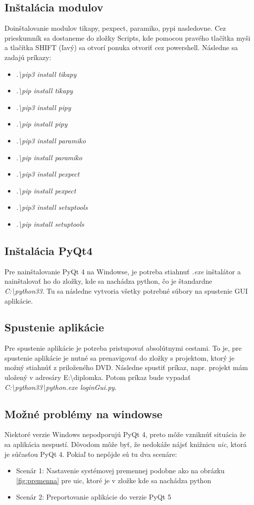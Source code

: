\subsection{Inštalácia modulov}
Doinštalovanie modulov tikapy, pexpect, paramiko, pypi nasledovne. Cez prieskumník sa dostaneme do zložky Scripts, kde pomocou pravého tlačítka myši a tlačítka SHIFT (ľavý) sa otvorí ponuka otvoriť cez powershell. Následne sa zadajú príkazy:
\begin{itemize}
\item \textit{.\textbackslash pip3 install tikapy} 
\item \textit{.\textbackslash pip install tikapy}
\item \textit{.\textbackslash pip3 install pipy}
\item \textit{.\textbackslash pip install pipy}
\item \textit{.\textbackslash pip3 install paramiko}
\item \textit{.\textbackslash pip install paramiko} 
\item \textit{.\textbackslash pip3 install pexpect}
\item \textit{.\textbackslash pip install pexpect}
\item \textit{.\textbackslash pip3 install setuptools}
\item \textit{.\textbackslash pip install setuptools}   
\end{itemize}
\subsection{Inštalácia PyQt4}
Pre nainštalovanie PyQt 4 na Windowse, je potreba stiahnuť \textit{.exe} inštalátor a nainštalovať ho do zložky, kde sa nachádza python, čo je štandardne \textit{C:\textbackslash python33}. Tu sa následne vytvoria všetky potrebné súbory na spustenie GUI aplikácie.
\subsection{Spustenie aplikácie}
Pre spustenie aplikácie je potreba pristupovať absolútnymi cestami. To je, pre spustenie aplikácie je nutné sa prenavigovať do zložky s projektom, ktorý je možný stiahnúť z priloženého DVD. Následne spustiť príkaz, napr. projekt mám uložený v adresáry E:\textbackslash diplomka. Potom príkaz bude vypadať \textit{C:\textbackslash python33\textbackslash python.exe loginGui.py}.
\subsection{Možné problémy na windowse}
Niektoré verzie Windows nepodporujú PyQt 4, preto môže vzniknúť situácia že sa aplikácia nespustí. Dôvodom môže byť, že nedokáže nájsť knižnicu \textit{uic}, ktorá je súčasťou PyQt 4. Pokiaľ to nepôjde sú tu dva scenáre:
\begin{itemize}
\item Scenár 1: Nastavenie systémovej premennej podobne ako na obrázku \ref{fig:premenna} pre uic, ktoré je v zložke kde sa nachádza python
\item Scenár 2: Preportovanie aplikácie do verzie PyQt 5
\end{itemize}  

